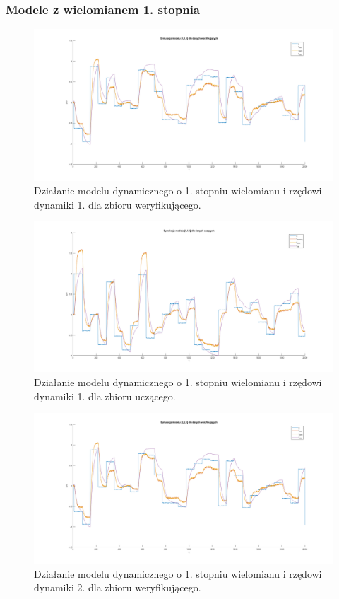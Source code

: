 \subsubsection{Modele z wielomianem 1. stopnia}
\begin{figure}[H]
\centering
\includegraphics[width=16cm,trim={5cm 1cm 5cm 1cm},clip]{images/d1.png}
\caption{Działanie modelu dynamicznego o 1. stopniu wielomianu i rzędowi dynamiki 1. dla zbioru weryfikującego.}
\label{fig:d1}
\end{figure}
\begin{figure}[H]
\centering
\includegraphics[width=16cm,trim={5cm 1cm 5cm 1cm},clip]{images/d2.png}
\caption{Działanie modelu dynamicznego o 1. stopniu wielomianu i rzędowi dynamiki 1. dla zbioru uczącego.}
\label{fig:d2}
\end{figure}
\begin{figure}[H]
\centering
\includegraphics[width=16cm,trim={5cm 1cm 5cm 1cm},clip]{images/d3.png}
\caption{Działanie modelu dynamicznego o 1. stopniu wielomianu i rzędowi dynamiki 2. dla zbioru weryfikującego.}
\label{fig:d3}
\end{figure}
